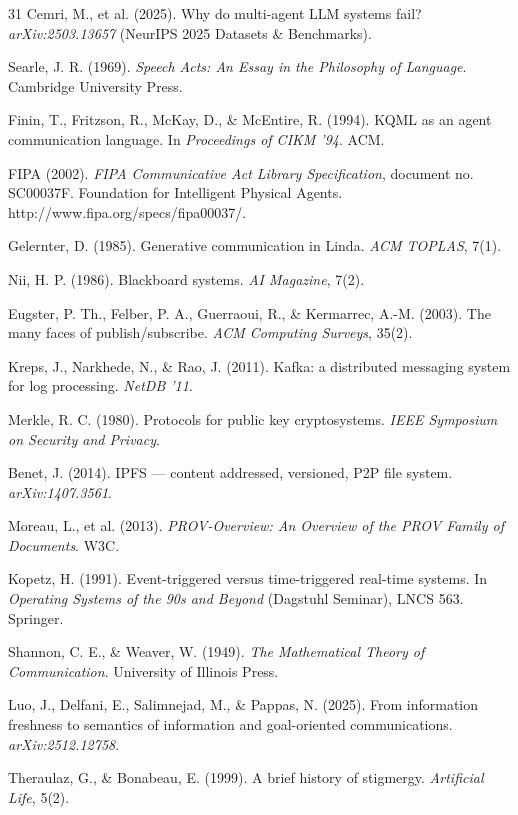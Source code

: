\documentclass[journal]{IEEEtran}
\begin{document}
\begin{thebibliography}{31}
Cemri, M., et al. (2025). Why do multi-agent LLM systems fail? \emph{arXiv:2503.13657} (NeurIPS 2025 Datasets \& Benchmarks).

Searle, J. R. (1969). \emph{Speech Acts: An Essay in the Philosophy of Language}. Cambridge University Press.

Finin, T., Fritzson, R., McKay, D., \& McEntire, R. (1994). KQML as an agent communication language. In \emph{Proceedings of CIKM '94}. ACM.

FIPA (2002). \emph{FIPA Communicative Act Library Specification}, document no. SC00037F. Foundation for Intelligent Physical Agents. http://www.fipa.org/specs/fipa00037/.

Gelernter, D. (1985). Generative communication in Linda. \emph{ACM TOPLAS}, 7(1).

Nii, H. P. (1986). Blackboard systems. \emph{AI Magazine}, 7(2).

Eugster, P. Th., Felber, P. A., Guerraoui, R., \& Kermarrec, A.-M. (2003). The many faces of publish/subscribe. \emph{ACM Computing Surveys}, 35(2).

Kreps, J., Narkhede, N., \& Rao, J. (2011). Kafka: a distributed messaging system for log processing. \emph{NetDB '11}.

Merkle, R. C. (1980). Protocols for public key cryptosystems. \emph{IEEE Symposium on Security and Privacy}.

Benet, J. (2014). IPFS --- content addressed, versioned, P2P file system. \emph{arXiv:1407.3561}.

Moreau, L., et al. (2013). \emph{PROV-Overview: An Overview of the PROV Family of Documents}. W3C.

Kopetz, H. (1991). Event-triggered versus time-triggered real-time systems. In \emph{Operating Systems of the 90s and Beyond} (Dagstuhl Seminar), LNCS 563. Springer.

Shannon, C. E., \& Weaver, W. (1949). \emph{The Mathematical Theory of Communication}. University of Illinois Press.

Luo, J., Delfani, E., Salimnejad, M., \& Pappas, N. (2025). From information freshness to semantics of information and goal-oriented communications. \emph{arXiv:2512.12758}.

Theraulaz, G., \& Bonabeau, E. (1999). A brief history of stigmergy. \emph{Artificial Life}, 5(2).


\end{thebibliography}
\end{document}
